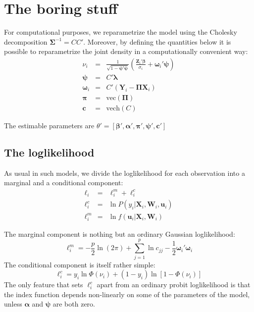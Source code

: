 \documentclass[a4paper,10pt]{article}
\newcommand{\HIP}{\texttt{HIP}}
\newcommand{\Depvar}{y_{i}}
\newcommand{\Endog}{\mathbf{Y}_{i}}
\newcommand{\Expla}{\mathbf{Z}_{i}}
\newcommand{\ExoInst}{\mathbf{X}_{i}}
\newcommand{\CSReg}{\mathbf{W}_{i}}
\newcommand{\RfDist}{\mathbf{u}_i}
\newcommand{\ScRfDist}{\bm{\omega}_i}
\newcommand{\ProbitPar}{\bm{\beta}}
\newcommand{\RfPar}{\bm{\Pi}}
\newcommand{\vRfPar}{\bm{\pi}}
\newcommand{\VarPar}{\bm{\alpha}}
\newcommand{\CondSig}{\sigma_i}
\newcommand{\Covars}{\bm{\lambda}}
\newcommand{\ScCov}{\bm{\psi}}
\newcommand{\RfVar}{\bm{\Sigma}}
\newcommand{\vechC}{\mathbf{c}}
\begin{document}

\section{The boring stuff}

For computational purposes, we reparametrize the model using the
Cholesky decomposition $\RfVar^{-1} = CC'$. Moreover, by defining the
quantities below it is possible to reparametrize the joint density in
a computationally convenient way:
\begin{eqnarray*}
  \nu_i & = & \frac{1}{\sqrt{1- \ScCov' \ScCov}}
  \left( \frac{\Expla'\ProbitPar}{\CondSig}  + \ScRfDist' \ScCov \right) \\
  \ScCov & = & C'\Covars \\
  \ScRfDist & = & C' \left(\Endog - \RfPar \ExoInst\right) \\
  \vRfPar & = & \mathrm{vec}\left(\RfPar\right) \\
  \vechC & = & \mathrm{vech}(C)
\end{eqnarray*}

The estimable parameters are $\theta' = \left[\ProbitPar', \VarPar',
  \vRfPar', \ScCov', \vechC' \right]$

\subsection{The loglikelihood}
\label{sec:loglik}

As usual in such models, we divide the loglikelihood for each
observation into a marginal and a conditional component:
\begin{eqnarray*}
  \ell_i & = & \ell^m_i + \ell^c_i \\
  \ell^c_i & = & \ln P(\Depvar | \ExoInst, \CSReg, \RfDist) \\
  \ell^m_i & = & \ln f(\RfDist | \ExoInst, \CSReg) 
\end{eqnarray*}

The marginal component is nothing but an ordinary Gaussian
loglikelihood:
\[
\ell^m_i = -\frac{p}{2}\ln(2\pi) + \sum_{j=1}^p \ln c_{jj} - 
\frac{1}{2}\ScRfDist' \ScRfDist
\]
The conditional component is itself rather simple:
\begin{equation}
  \ell^c_i = \Depvar \ln\Phi(\nu_i) + \left(1-\Depvar\right)
  \ln \left[1-\Phi\left(\nu_i \right)\right]
\end{equation}
The only feature that sets $\ell^c_i$ apart from an ordinary probit
loglikelihood is that the index function depends non-linearly on some
of the parameters of the model, unless $\VarPar$ and $\ScCov$ are both
zero.
\end{document}
